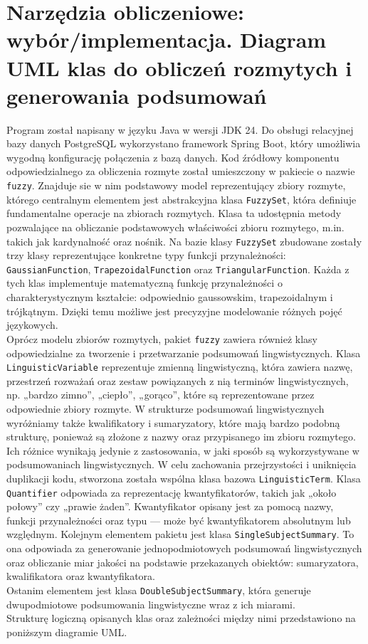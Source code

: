\documentclass{article}
\begin{document}
\section{Narzędzia obliczeniowe: wybór/implementacja. Diagram UML klas do obliczeń rozmytych i generowania podsumowań}
Program został napisany w języku Java w wersji JDK 24. Do obsługi relacyjnej bazy danych PostgreSQL wykorzystano framework Spring Boot, który umożliwia wygodną konfigurację połączenia z bazą danych. Kod źródłowy komponentu odpowiedzialnego za obliczenia rozmyte został umieszczony w pakiecie o nazwie \texttt{fuzzy}. Znajduje sie w nim podstawowy model reprezentujący zbiory rozmyte, którego centralnym elementem jest abstrakcyjna klasa \texttt{FuzzySet}, która definiuje fundamentalne operacje na zbiorach rozmytych. Klasa ta udostępnia metody pozwalające na obliczanie podstawowych właściwości zbioru rozmytego, m.in. takich jak kardynalność oraz nośnik. Na bazie klasy \texttt{FuzzySet} zbudowane zostały trzy klasy reprezentujące konkretne typy funkcji przynależności: \texttt{GaussianFunction}, \texttt{TrapezoidalFunction} oraz \texttt{TriangularFunction}. Każda z tych klas implementuje matematyczną funkcję przynależności o charakterystycznym kształcie: odpowiednio gaussowskim, trapezoidalnym i trójkątnym. Dzięki temu możliwe jest precyzyjne modelowanie różnych pojęć językowych. \\
Oprócz modelu zbiorów rozmytych, pakiet \texttt{fuzzy} zawiera również klasy odpowiedzialne za tworzenie i przetwarzanie podsumowań lingwistycznych. Klasa \texttt{LinguisticVariable} reprezentuje zmienną lingwistyczną, która zawiera nazwę, przestrzeń rozważań oraz zestaw powiązanych z nią terminów lingwistycznych, np. „bardzo zimno”, „ciepło”, „gorąco”, które są reprezentowane przez odpowiednie zbiory rozmyte.
W strukturze podsumowań lingwistycznych wyróżniamy także kwalifikatory i sumaryzatory, które mają bardzo podobną strukturę, ponieważ są złożone z nazwy oraz przypisanego im zbioru rozmytego. Ich różnice wynikają jedynie z zastosowania, w jaki sposób są wykorzystywane w podsumowaniach lingwistycznych. W celu zachowania przejrzystości i uniknięcia duplikacji kodu, stworzona została wspólna klasa bazowa \texttt{LinguisticTerm}. 
Klasa \texttt{Quantifier} odpowiada za reprezentację kwantyfikatorów, takich jak „około połowy” czy „prawie żaden”. Kwantyfikator opisany jest za pomocą nazwy, funkcji przynależności oraz typu — może być kwantyfikatorem absolutnym lub względnym.
Kolejnym elementem pakietu jest klasa \texttt{SingleSubjectSummary}. To ona odpowiada za generowanie jednopodmiotowych podsumowań lingwistycznych oraz obliczanie miar jakości na podstawie przekazanych obiektów: sumaryzatora, kwalifikatora oraz kwantyfikatora. \\
Ostanim elementem jest klasa \texttt{DoubleSubjectSummary}, która generuje dwupodmiotowe podsumowania lingwistyczne wraz z ich miarami. \\
Strukturę logiczną opisanych klas oraz zależności między nimi przedstawiono na poniższym diagramie UML.
\end{document}
